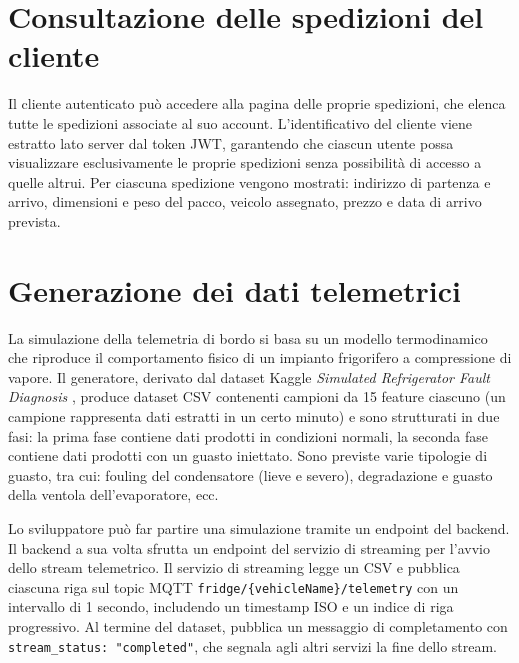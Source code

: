 \section{Consultazione delle spedizioni del cliente}
\label{sec:spedizioni_cliente}

Il cliente autenticato può accedere alla pagina delle proprie spedizioni, che elenca tutte le spedizioni associate al suo account. L'identificativo del cliente viene estratto lato server dal token JWT, garantendo che ciascun utente possa visualizzare esclusivamente le proprie spedizioni senza possibilità di accesso a quelle altrui. Per ciascuna spedizione vengono mostrati: indirizzo di partenza e arrivo, dimensioni e peso del pacco, veicolo assegnato, prezzo e data di arrivo prevista.

\section{Generazione dei dati telemetrici}
\label{sec:generazione_dati}

La simulazione della telemetria di bordo si basa su un modello termodinamico che riproduce il comportamento fisico di un impianto frigorifero a compressione di vapore. 
Il generatore, derivato dal dataset Kaggle \textit{Simulated Refrigerator Fault Diagnosis} \cite{kaggle_fridge}, produce dataset CSV contenenti campioni da 15 feature ciascuno (un campione rappresenta dati estratti in un certo minuto) e sono strutturati in due fasi: la prima fase contiene dati prodotti in condizioni normali, la seconda fase contiene dati prodotti con un guasto iniettato. 
Sono previste varie tipologie di guasto, tra cui: fouling del condensatore (lieve e severo), degradazione e guasto della ventola dell'evaporatore, ecc. 

Lo sviluppatore può far partire una simulazione tramite un endpoint del backend. Il backend a sua volta sfrutta un endpoint del servizio di streaming per l'avvio dello stream telemetrico. Il servizio di streaming legge un CSV e pubblica ciascuna riga sul topic MQTT \texttt{fridge/\{vehicleName\}/telemetry} con un intervallo di 1 secondo, includendo un timestamp ISO e un indice di riga progressivo. Al termine del dataset, pubblica un messaggio di completamento con \texttt{stream\_status: "completed"}, che segnala agli altri servizi la fine dello stream.


